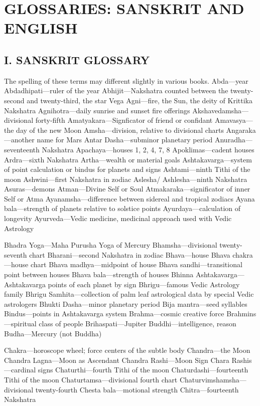 \section{GLOSSARIES: SANSKRIT AND ENGLISH}

\subsection{I. SANSKRIT GLOSSARY}
The spelling of these terms may different slightly in various books.   Abda—year Abdadhipati—ruler of the year Abhijit—Nakshatra counted between the twenty-second and twenty-third, the star Vega Agni—fire, the Sun, the deity of Krittika Nakshatra Agnihotra—daily sunrise and sunset fire offerings Akshavedamsha—divisional forty-fifth Amatyakara—Signficator of friend or confidant Amavasya—the day of the new Moon Amsha—division, relative to divisional charts Angaraka—another name for Mars Antar Dasha—subminor planetary period Anuradha—seventeenth Nakshatra Apachaya—houses 1, 2, 4, 7, 8 Apoklimas—cadent houses Ardra—sixth Nakshatra Artha—wealth or material goals Ashtakavarga—system of point calculation or bindus for planets and signs Ashtami—ninth Tithi of the moon Ashwini—first Nakshatra in zodiac Aslesha/ Ashlesha—ninth Nakshatra Asuras—demons Atman—Divine Self or Soul Atmakaraka—significator of inner Self or Atma Ayanamsha—difference between sidereal and tropical zodiacs Ayana bala—strength of planets relative to solstice points Ayurdaya—calculation of longevity Ayurveda—Vedic medicine, medicinal approach used with Vedic Astrology  

Bhadra Yoga—Maha Purusha Yoga of Mercury Bhamsha—divisional twenty-seventh chart Bharani—second Nakshatra in zodiac Bhava—house Bhava chakra—house chart Bhava madhya—midpoint of house Bhava sandhi—transitional point between houses Bhava bala—strength of houses Bhinna Ashtakavarga—Ashtakavarga points of each planet by sign Bhrigu—famous Vedic Astrology family Bhrigu Samhita—collection of palm leaf astrological data by special Vedic astrologers Bhukti Dasha—minor planetary period Bija mantra—seed syllables Bindus—points in Ashtakavarga system Brahma—cosmic creative force Brahmins—spiritual class of people Brihaspati—Jupiter Buddhi—intelligence, reason Budha—Mercury (not Buddha)  

Chakra—horoscope wheel; force centers of the subtle body Chandra—the Moon Chandra Lagna—Moon as Ascendant Chandra Rashi—Moon Sign Chara Rashis—cardinal signs Chaturthi—fourth Tithi of the moon Chaturdashi—fourteenth Tithi of the moon Chaturtamsa—divisional fourth chart Chaturvimshamsha—divisional twenty-fourth Chesta bala—motional strength Chitra—fourteenth Nakshatra  

